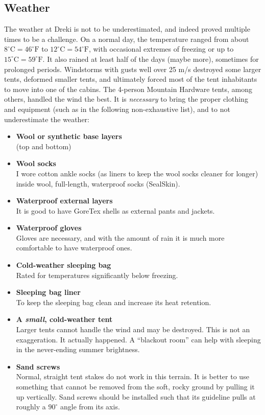 \subsection{Weather}

The weather at Dreki is not to be underestimated, and indeed proved multiple times to be a challenge.
On a normal day, the temperature ranged from about
$8^\circ \mathrm{C}=46^\circ \mathrm{F}$ to $12^\circ \mathrm{C}=54^\circ \mathrm{F}$,
with occasional extremes of freezing or up to $15^\circ \mathrm{C}=59^\circ \mathrm{F}$.
It also rained at least half of the days (maybe more), sometimes for prolonged periods.
Windstorms with gusts well over 25 m/s destroyed some larger tents, deformed smaller tents,
and ultimately forced most of the tent inhabitants to move into one of the cabins.
The 4-person Mountain Hardware tents, among others, handled the wind the best.
It is \emph{necessary} to bring the proper clothing and equipment
(such as in the following non-exhaustive list), and to not underestimate the weather:
\begin{itemize}
	\item \textbf{Wool or synthetic base layers}\\(top and bottom)
	\item \textbf{Wool socks}\\I wore cotton ankle socks (as liners to keep the wool socks cleaner for longer) inside wool, full-length,
		waterproof socks (SealSkin).
	\item \textbf{Waterproof external layers}\\It is good to have GoreTex shells
		as external pants and jackets.
	\item \textbf{Waterproof gloves}\\Gloves are necessary, and with the amount of rain it is much
		more comfortable to have waterproof ones.
	\item \textbf{Cold-weather sleeping bag}\\Rated for temperatures significantly below freezing.
	\item \textbf{Sleeping bag liner}\\To keep the sleeping bag clean and increase its heat retention.
	\item \textbf{A \emph{small}, cold-weather tent}\\Larger tents cannot handle the wind and may be destroyed. This is not an exaggeration. It actually happened. A ``blackout room'' can help with sleeping in the never-ending summer brightness.
	\item \textbf{Sand screws}\\Normal, straight tent stakes do not work in this terrain. It is better to use something that cannot be removed from the soft, rocky ground by pulling it up vertically. Sand screws should be installed such that its guideline pulls at roughly a $90^\circ$ angle from its axis.
\end{itemize}
